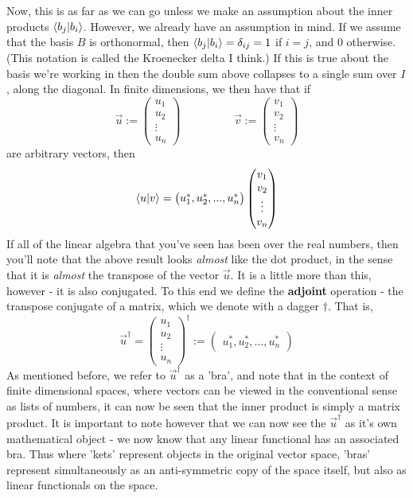\documentclass{article}
\theoremstyle{definition}
\theoremstyle{plain}
\theoremstyle{theorem}
\begin{document}
	Now, this is as far as we can go unless we make an assumption about the inner products $\braket{b_j|b_i}$. However, we already have an assumption in mind. If we assume that the basis $B$ is orthonormal, then $\braket{b_j|b_i} = \delta_{ij}=1$ if $i=j$, and $0$ otherwise. (This notation is called the Kroenecker delta I think.) If this is true about the basis we're working in then the double sum above collapses to a single sum over $I$, along the diagonal. In finite dimensions, we then have that if
	\[ \vec{u} := \begin{pmatrix} u_1 \\ u_2 \\ \vdots \\ u_n \end{pmatrix} \hspace{2cm} \vec{v} := \begin{pmatrix} v_1 \\ v_2 \\ \vdots \\ v_n \end{pmatrix} \]
	are arbitrary vectors, then
	\begin{align}
		\braket{u|v} = \begin{pmatrix} u_1^*, u_2^*,...,u_n^* \end{pmatrix} \begin{pmatrix} v_1 \\ v_2 \\ \vdots \\ v_n \end{pmatrix}
	\end{align}
	If all of the linear algebra that you've seen has been over the real numbers, then you'll note that the above result looks \textit{almost} like the dot product, in the sense that it is \textit{almost} the transpose of the vector $\vec{u}$. It is a little more than this, however - it is also conjugated. To this end we define the \textbf{adjoint} operation - the transpose conjugate of a matrix, which we denote with a dagger $\dagger$. That is,	\[ \vec{u}^{\dagger} = \begin{pmatrix} u_1 \\ u_2 \\ \vdots \\ u_n \end{pmatrix}^{\dagger} := \begin{pmatrix} u_1^*, u_2^*, \ldots, u_n^* \end{pmatrix}  \]
	As mentioned before, we refer to $\vec{u}^{\dagger}$ as a 'bra', and note that in the context of finite dimensional spaces, where vectors can be viewed in the conventional sense as lists of numbers, it can now be seen that the inner product is simply a matrix product. It is important to note however that we can now see the $\vec{u}^{\dagger}$ as it's own mathematical object - we now know that any linear functional has an associated bra. Thus where 'kets' represent objects in the original vector space, 'bras' represent simultaneously as an anti-symmetric copy of the space itself, but also as linear functionals on the space.
\end{document}
